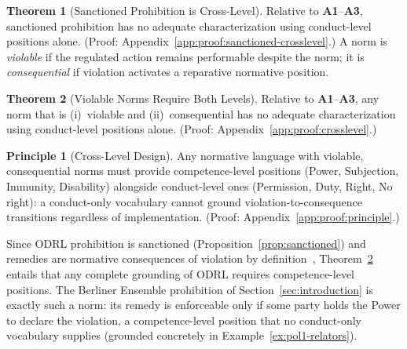 \documentclass{IOS-Book-Article}
\theoremstyle{definition}
\newtheorem{theorem}{Theorem}[section]
\newtheorem{principle}{Principle}
\begin{document}
\noindent
\begin{theorem}[Sanctioned Prohibition is Cross-Level]
\label{thm:sanctioned-crosslevel}
Relative to \textbf{A1}--\textbf{A3}, sanctioned prohibition has no
adequate characterization using conduct-level positions alone.
(Proof: Appendix~\ref{app:proof:sanctioned-crosslevel}.) A norm is \emph{violable} if the regulated action
remains performable despite the norm; it is
\emph{consequential} if violation activates a reparative
normative position.
\end{theorem}
\noindent
\begin{theorem}[Violable Norms Require Both Levels]
\label{thm:crosslevel}
Relative to \textbf{A1}--\textbf{A3}, any norm that is
(i)~violable and (ii)~consequential has no adequate
characterization using conduct-level positions alone.
(Proof: Appendix~\ref{app:proof:crosslevel}.)
\end{theorem}
\noindent
\begin{principle}[Cross-Level Design]
\label{prin:crosslevel}
Any normative language with violable, consequential norms must
provide competence-level positions (Power, Subjection, Immunity,
Disability) alongside conduct-level ones (Permission, Duty,
Right, No right): a conduct-only vocabulary cannot ground
violation-to-consequence transitions regardless of implementation.
(Proof: Appendix~\ref{app:proof:principle}.)
\end{principle}
\noindent Since ODRL prohibition is sanctioned
(Proposition~\ref{prop:sanctioned}) and remedies are normative consequences of
violation by definition~\cite{iannella2018odrl}, Theorem~\ref{thm:crosslevel}
entails that any complete grounding of ODRL requires competence-level positions.
The Berliner Ensemble prohibition of Section~\ref{sec:introduction} is exactly
such a norm: its remedy is enforceable only if some party holds the Power to
declare the violation, a competence-level position that no conduct-only
vocabulary supplies (grounded concretely in Example~\ref{ex:pol1-relators}).
\end{document}
